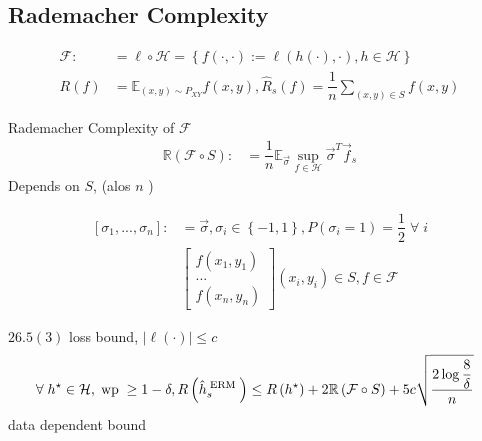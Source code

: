 \documentclass{article}
\begin{document}
\subsection{Rademacher Complexity}
\begin{align*}
\mathcal{F} :&= \ell \circ \mathcal{H} = \left\{f\left(\cdot , \cdot \right) := \ell\left(h\left(\cdot \right), \cdot \right), h \in \mathcal{H}\right\}
\\ R\left(f\right)  &= \mathbb{E}_{\left(x, y\right) \sim  P_{XY}} f\left(x, y\right), \hat{R}_{s}\left(f\right) = \dfrac{1}{n} \displaystyle\sum_{\left(x, y\right) \in S} f\left(x, y\right) 
\end{align*}
\begin{df} \label{df:rad} 
Rademacher Complexity of $\mathcal{F}$
\begin{align*}
\mathbb{R}\left(\mathcal{F} \circ S\right) :&= \dfrac{1}{n} \mathbb{E}_{\vec{\sigma}} \displaystyle\sup_{f \in \mathcal{H}} \vec{\sigma}^{T} \vec{f}_{s}
\end{align*}
Depends on $S $, (alos $n $ )
\newline \newline\end{df}
\begin{align*}
\left[\sigma_{1}, ..., \sigma_{n}\right] :&= \vec{\sigma} , \sigma_{i} \in\left\{-1, 1\right\}, P\left(\sigma_{i} = 1\right)  = \dfrac{1}{2} \;\forall\; i 
\\ &\begin{bmatrix} f\left(x_{1}, y_{1}\right) \\ ... \\ f\left(x_{n}, y_{n}\right) \end{bmatrix} \left(x_{i}, y_{i}\right) \in S, f \in \mathcal{F}
\end{align*}
\begin{thm} \label{thm:radc} 
$26.5 \left(3\right)$ loss bound, $| \ell\left(\cdot \right) | \leq  c $
\begin{align*}
\;\forall\; h^\star  \in \mathcal{H}, \text{\;wp\;} &\geq  1 - \delta, R\left(\hat{h}_{s}^{\text{\;ERM\;}}\right) \leq  R\left(h^\star \right) + 2 \mathbb{R}\left(\mathcal{F} \circ S\right) + 5 c \sqrt{\dfrac{2 \log \dfrac{8}{\delta}}{n}}
\end{align*}
data dependent bound
\newline \newline\end{thm}
\end{document}
